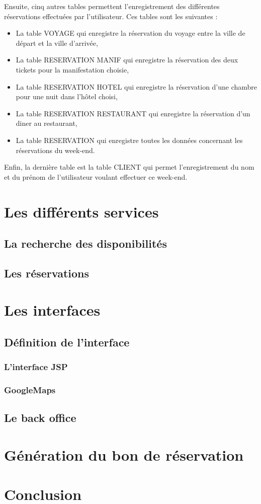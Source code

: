\documentclass[11pt,a4paper]{article}
\begin{document}
Ensuite, cinq autres tables permettent l'enregistrement des différentes
réservations effectuées par l'utilisateur. Ces tables sont les suivantes :\\

\begin{itemize}
  \item La table VOYAGE qui enregistre la réservation du voyage entre la ville
  de départ et la ville d'arrivée,
  \item La table RESERVATION MANIF qui enregistre la réservation des deux tickets
  pour la manifestation choisie,
  \item La table RESERVATION HOTEL qui enregistre la réservation d'une chambre pour
  une nuit dans l'hôtel choisi,
  \item La table RESERVATION RESTAURANT qui enregistre la réservation d'un
  diner au restaurant,
  \item La table RESERVATION qui enregistre toutes les données concernant les
  réservations du week-end.\\
\end{itemize}

Enfin, la dernière table est la table CLIENT qui permet l'enregistrement du nom
et du prénom de l'utilisateur voulant effectuer ce week-end.


\section{Les différents services}
\subsection{La recherche des disponibilités}
\subsection{Les réservations}

\section{Les interfaces}
\subsection{Définition de l'interface}
\subsubsection{L'interface JSP}
\subsubsection{GoogleMaps}
\subsection{Le back office}

\section{Génération du bon de réservation}

\section{Conclusion}
\end{document}
